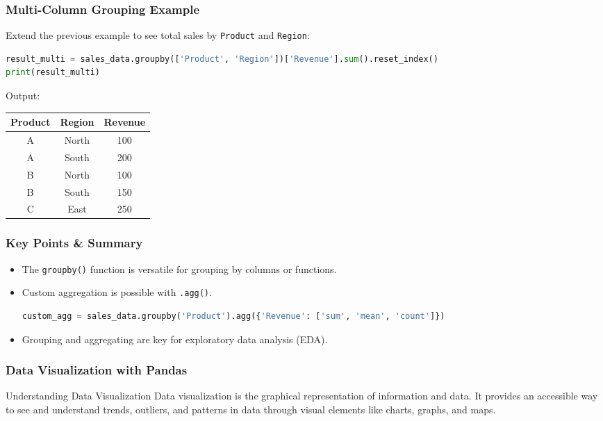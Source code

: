 \documentclass{beamer}
\begin{document}
\begin{frame}[fragile]
    \frametitle{Multi-Column Grouping Example}
    Extend the previous example to see total sales by \texttt{Product} and \texttt{Region}:
    \begin{lstlisting}[language=Python]
result_multi = sales_data.groupby(['Product', 'Region'])['Revenue'].sum().reset_index()
print(result_multi)
    \end{lstlisting}
    
    Output:
    \begin{center}
    \begin{tabular}{|c|c|c|}
        \hline
        Product & Region & Revenue \\
        \hline
        A & North & 100 \\
        A & South & 200 \\
        B & North & 100 \\
        B & South & 150 \\
        C & East & 250 \\
        \hline
    \end{tabular}
    \end{center}
\end{frame}

\begin{frame}[fragile]
    \frametitle{Key Points & Summary}
    \begin{itemize}
        \item The \texttt{groupby()} function is versatile for grouping by columns or functions.
        \item Custom aggregation is possible with \texttt{.agg()}.
        \begin{lstlisting}[language=Python]
custom_agg = sales_data.groupby('Product').agg({'Revenue': ['sum', 'mean', 'count']})
        \end{lstlisting}
        \item Grouping and aggregating are key for exploratory data analysis (EDA).
    \end{itemize}
\end{frame}

\begin{frame}[fragile]
    \frametitle{Data Visualization with Pandas}
    \begin{block}{Understanding Data Visualization}
        Data visualization is the graphical representation of information and data. It provides an accessible way to see and understand trends, outliers, and patterns in data through visual elements like charts, graphs, and maps.
    \end{block}
\end{frame}
\end{document}
